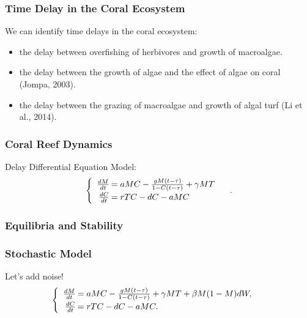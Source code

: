 \begin{frame}
\frametitle{Time Delay in the Coral Ecosystem}
We can identify time delays in the coral ecosystem:
\begin{itemize}
\item the delay between overfishing of herbivores and growth of macroalgae.\\
\item the delay between the growth of algae and the effect of algae on coral (Jompa, 2003).\\
\item the delay between the grazing of macroalgae and growth of algal turf (Li et al., 2014).
\end{itemize}
\end{frame}

\begin{frame}\frametitle{Coral Reef Dynamics}
Delay Differential Equation Model:
$$\begin{cases}
\begin{array}{rl}
\frac{dM}{dt}\hspace{-.8em}&=aMC - \frac{gM(t-\tau)}{1-C(t-\tau)} + \gamma M T\\
\frac{dC}{dt}\hspace{-.8em}&=rTC - dC - aMC\\
\end{array}
\end{cases}.$$
\end{frame}

\begin{frame}
\frametitle{Equilibria and Stability}
\end{frame}

\begin{frame}
\frametitle{Stochastic Model}
Let's add noise!
$$\begin{cases}
\begin{array}{rl}
\frac{dM}{dt}\hspace{-.8em}&=aMC - \frac{gM(t-\tau)}{1-C(t-\tau)}+\gamma M T+\beta M(1-M)dW,\\
\frac{dC}{dt}\hspace{-.8em}&=rTC - dC - aMC.\\
\end{array}
\end{cases}$$
\end{frame}

